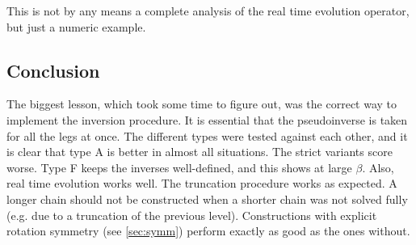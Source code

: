This is not by any means a complete analysis of the real time evolution operator, but just a numeric example.

\subsection{Conclusion}

The biggest lesson, which took some time to figure out, was the correct way to implement the inversion procedure. It is essential that the pseudoinverse is taken for all the legs at once. The different types were tested against each other, and it is clear that type A is better in almost all situations. The strict variants score worse. Type F keeps the inverses well-defined, and this shows at large $\beta$. Also, real time evolution works well. The truncation procedure works as expected. A longer chain should not be constructed when a shorter chain was not solved fully (e.g. due to a truncation of the previous level). Constructions with explicit rotation symmetry (see \cref{sec:symm}) perform exactly as good as the ones without.